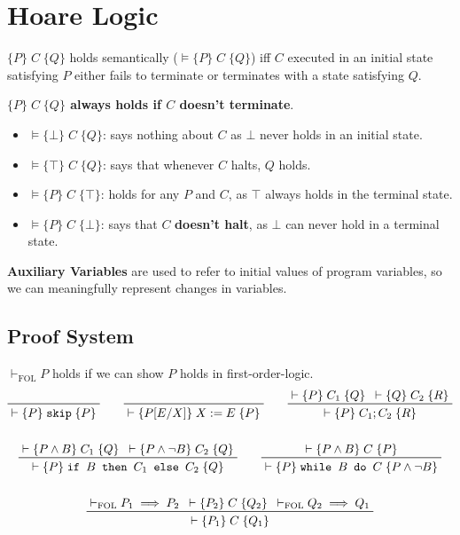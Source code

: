 \documentclass[a4paper, 11pt]{article}
\newcommand{\triple}[3]{\{#1\}\;#2\;\{#3\}}
\newcommand{\triplem}[3]{\(\triple{#1}{#2}{#3}\)}
\begin{document}
\section*{Hoare Logic}
{
    \triplem{P}{C}{Q} holds semantically (\(\vDash \triple{P}{C}{Q}\)) iff \(C\) executed in an initial state satisfying \(P\) either fails to terminate or terminates with a state satisfying \(Q\).

    \textbf{\(\{P\}\;C\;\{Q\}\) always holds if \(C\) doesn't terminate}.

    \begin{itemize}
    \item \(\vDash \triple{\bot}{C}{Q}\): says nothing about \(C\) as \(\bot\) never holds in an initial state.
    \item \(\vDash \triple{\top}{C}{Q}\): says that whenever \(C\) halts, \(Q\) holds.
    \item \(\vDash \triple{P}{C}{\top}\): holds for any \(P\) and \(C\), as \(\top\) always holds in the terminal state.
    \item \(\vDash \triple{P}{C}{\bot}\): says that \(C\) \textbf{doesn't halt}, as \(\bot\) can never hold in a terminal state.
    \end{itemize}

    \textbf{Auxiliary Variables} are used to refer to initial values of program variables, so we can meaningfully represent changes in variables.

    \subsection*{Proof System}
    {
        \(\vdash_\text{FOL}P\) holds if we can show \(P\) holds in first-order-logic.
        \begin{gather*}
        \prftree[r]{}
        {\vdash \triple{P}{\texttt{skip}}{P}}
        \qquad
        \prftree[r]{}
        {\vdash \triple{P[E/X]}{X := E}{P}}
        \qquad
        \prftree[r]{}
        {\vdash \triple{P}{C_1}{Q}}
        {\vdash \triple{Q}{C_2}{R}}
        {\vdash \triple{P}{C_1;C_2}{R}}
        \\
        \\
        \prftree[r]{}
        {\vdash \triple{P \wedge B}{C_1}{Q}}
        {\vdash \triple{P \wedge \neg B}{C_2}{Q}}
        {\vdash \triple{P}{\texttt{if }B\texttt{ then }C_1\texttt{ else }C_2}{Q}}
        \qquad
        \prftree[r]{}
        {\vdash \triple{P \wedge B}{C}{P}}
        {\vdash \triple{P}{\texttt{while }B\texttt{ do }C}{P \wedge \neg B}}
        \\
        \\
        \prftree[r]{}
        {\vdash_\text{FOL} P_1 \implies P_2}
        {\vdash \triple{P_2}{C}{Q_2}}
        {\vdash_\text{FOL} Q_2 \implies Q_1}
        {\vdash \triple{P_1}{C}{Q_1}}
        \end{gather*}
    }
}
\end{document}
